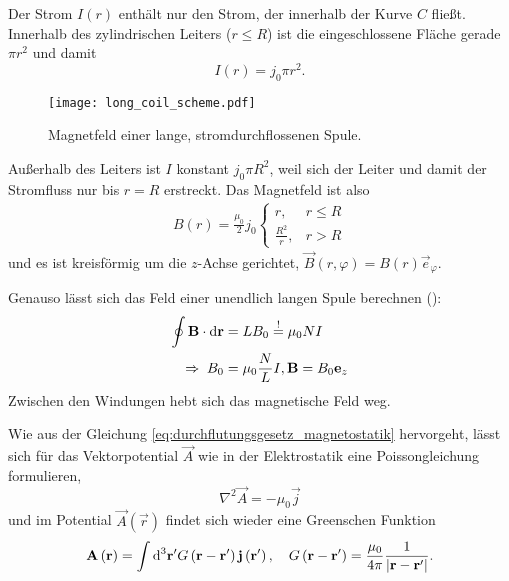Der Strom $I\left(r\right)$ enthält nur den Strom, der innerhalb der Kurve $C$ fließt. Innerhalb des zylindrischen Leiters ($r\leq R$) ist die eingeschlossene Fläche gerade $\pi r^{2}$ und damit
\begin{equation*}
	I\left(r\right)=j_{0}\pi r^{2}.
\end{equation*}


\begin{figure}[htb]
	\centering
	\texttt{[image: long\_coil\_scheme.pdf]}
	\caption{Magnetfeld einer lange, stromdurchflossenen Spule. }
	\label{fig:long_coil_scheme}
\end{figure}

Außerhalb des Leiters ist $I$ konstant $j_{0}\pi R^{2}$, weil sich der Leiter und damit der Stromfluss nur bis $r=R$ erstreckt. Das Magnetfeld ist also
\begin{align*}
	B\left(r\right)=\frac{\mu _{0}}{2}j_{0}\begin{cases} r,               & r\leq R \\
              \frac{R^{2}}{r}, & r>R
	                                       \end{cases}
\end{align*}
und es ist kreisförmig um die $z$-Achse gerichtet, $\vec {B}\left(r,\varphi \right)=B\left(r\right)\vec {e}_{\varphi }$.

Genauso lässt sich das Feld einer unendlich langen Spule berechnen ():
\begin{align*}
		\oint \mathbf{B}\cdot \text{d} \mathbf{r}&=LB_{0}\overset{!}{=}\mu _{0}NI \\
		\;\Rightarrow\; B_{0}&=\mu _{0}\frac{N}{L}I, \mathbf{B}=B_{0}\mathbf{e}_{z}
\end{align*}
Zwischen den Windungen hebt sich das magnetische Feld weg.

Wie aus der Gleichung \eqref{eq:durchflutungsgesetz_magnetostatik} hervorgeht, lässt sich für das Vektorpotential $\vec {A}$ wie in der Elektrostatik eine Poissongleichung formulieren,
\begin{equation*}
	\nabla ^{2}\vec {A}=-\mu _{0}\vec {j}
\end{equation*}
und im Potential $\vec {A}\left(\vec {r}\right)$ findet sich wieder eine Greenschen Funktion
\begin{equation*}
	\mathbf{A}\left(\mathbf{r}\right)=\int \text{d} ^{3}\mathbf{r}'G\left(\mathbf{r}-\mathbf{r}'\right)\mathbf{j}\left(\mathbf{r}'\right),\quad G\left(\mathbf{r}-\mathbf{r}'\right)=\frac{\mu _{0}}{4\pi }\frac{1}{\left| \mathbf{r}-\mathbf{r}'\right| }.
\end{equation*}
